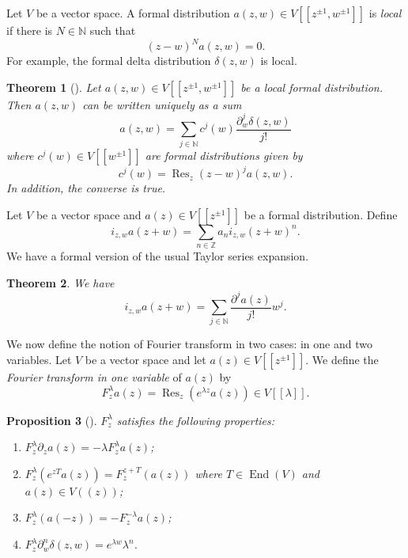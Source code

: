 \documentclass[a4paper, 12pt, reqno]{amsart}
\newtheorem{theorem}{Theorem}[subsection]
\newtheorem{proposition}[theorem]{Proposition}
\theoremstyle{remark}
\numberwithin{equation}{subsection}
\DeclareMathOperator{\End}{End}
\DeclareMathOperator{\Res}{Res}
\begin{document}
Let $V$ be a vector space.
A formal distribution $a(z, w) \in V[[z^{\pm 1}, w^{\pm 1}]]$ is \emph{local} if there is $N \in \mathbb{N}$ such that
\begin{equation*}
  (z - w)^Na(z, w)=0.
\end{equation*}
For example, the formal delta distribution $\delta(z, w)$ is local.

\begin{theorem}[{\cite[Proposition 2.2]{kac_vertex_1998}}]
  \label{thr:1}
  Let $a(z, w) \in V[[z^{\pm 1}, w^{\pm 1}]]$ be a local formal distribution.
  Then $a(z, w)$ can be written uniquely as a sum
  \begin{equation}
    \label{eq:1}
    a(z, w) = \sum_{j \in \mathbb{N}}c^j(w)\frac{\partial_w^j\delta(z, w)}{j!}
  \end{equation}
  where $c^j(w) \in V[[w^{\pm 1}]]$ are formal distributions given by
  \begin{equation}
    \label{eq:2}
    c^j(w) = \Res_z(z - w)^ja(z, w).
  \end{equation}
  In addition, the converse is true.
\end{theorem}

Let $V$ be a vector space and  $a(z) \in V[[z^{\pm 1}]]$ be a formal distribution.
Define
\begin{equation*}
  i_{z, w}a(z + w) = \sum_{n \in \mathbb{Z}} a_ni_{z, w}(z + w)^n.
\end{equation*}
We have a formal version of the usual Taylor series expansion.

\begin{theorem}
  \label{thr:2}
  We have
  \begin{equation*}
    i_{z, w}a(z + w) = \sum_{j \in \mathbb{N}}\frac{\partial^ja(z)}{j!}w^j.
  \end{equation*}
\end{theorem}

We now define the notion of Fourier transform in two cases: in one and two variables. Let $V$ be a vector space and let $a(z) \in V[[z^{\pm 1}]]$.
We define the \emph{Fourier transform in one variable} of $a(z)$ by
\begin{equation*}
  F^\lambda_za(z) = \Res_z(e^{\lambda z}a(z)) \in V[[\lambda]].
\end{equation*}

\begin{proposition}[{\cite[Proposition 1.5.2]{nozaradan_introduction_2008}}]
  \label{prp:1}
  $F^\lambda_z$ satisfies the following properties:
  \begin{enumerate}
  \item $F^\lambda_z\partial_za(z) = -\lambda F^\lambda_za(z)$;
  \item $F^\lambda_z(e^{zT}a(z)) = F^{z + T}_z(a(z))$ where $T \in \End(V)$ and $a(z) \in V((z))$;
  \item $F^\lambda_z(a(-z)) = -F^{-\lambda}_za(z)$;
  \item $F^\lambda_z\partial^n_w\delta(z, w) = e^{\lambda w}\lambda^n$.
  \end{enumerate}
\end{proposition}
\end{document}
